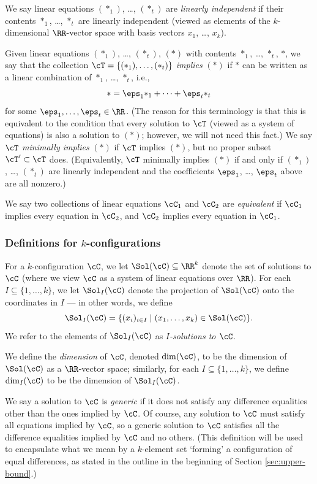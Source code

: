 We say linear equations $(*_1)$, \ldots, $(*_t)$ are \emph{linearly independent} if their contents $*_1$, \ldots, $*_t$ are linearly independent (viewed as elements of the $k$-dimensional $\RR$-vector space with basis vectors $x_1$, \ldots, $x_k$). 

Given linear equations $(*_1)$, \ldots, $(*_t)$, $(*)$ with contents $*_1$, \ldots, $*_t$, $*$, we say that the collection $\cT = \{(*_1), \ldots, (*_t)\}$ \emph{implies} $(*)$ if $*$ can be written as a linear combination of $*_1$, \ldots, $*_t$, i.e., \[{*} = \eps_1{*_1} + \cdots + \eps_t{*_t}\] for some $\eps_1, \ldots, \eps_t \in \RR$. (The reason for this terminology is that this is equivalent to the condition that every solution to $\cT$ (viewed as a system of equations) is also a solution to $(*)$; however, we will not need this fact.) We say $\cT$ \emph{minimally implies} $(*)$ if $\cT$ implies $(*)$, but no proper subset $\cT' \subset \cT$ does. (Equivalently, $\cT$ minimally implies $(*)$ if and only if $(*_1)$, \ldots, $(*_t)$ are linearly independent and the coefficients $\eps_1$, \ldots, $\eps_t$ above are all nonzero.) 

We say two collections of linear equations $\cC_1$ and $\cC_2$ are \emph{equivalent} if $\cC_1$ implies every equation in $\cC_2$, and $\cC_2$ implies every equation in $\cC_1$. 

\subsubsection{Definitions for \texorpdfstring{$k$}{k}-configurations}

For a $k$-configuration $\cC$, we let $\Sol(\cC) \subseteq \RR^k$ denote the set of solutions to $\cC$ (where we view $\cC$ as a system of linear equations over $\RR$). For each $I \subseteq \{1, \ldots, k\}$, we let $\Sol_I(\cC)$ denote the projection of $\Sol(\cC)$ onto the coordinates in $I$ --- in other words, we define \[\Sol_I(\cC) = \{(x_i)_{i \in I} \mid (x_1, \ldots, x_k) \in \Sol(\cC)\}.\] We refer to the elements of $\Sol_I(\cC)$ as \emph{$I$-solutions to $\cC$}. 

We define the \emph{dimension} of $\cC$, denoted $\dim(\cC)$, to be the dimension of $\Sol(\cC)$ as a $\RR$-vector space; similarly, for each $I \subseteq \{1, \ldots, k\}$, we define $\dim_I(\cC)$ to be the dimension of $\Sol_I(\cC)$. 

We say a solution to $\cC$ is \emph{generic} if it does not satisfy any difference equalities other than the ones implied by $\cC$. Of course, any solution to $\cC$ must satisfy all equations implied by $\cC$, so a generic solution to $\cC$ satisfies all the difference equalities implied by $\cC$ and no others. (This definition will be used to encapsulate what we mean by a $k$-element set `forming' a configuration of equal differences, as stated in the outline in the beginning of Section \ref{sec:upper-bound}.)

